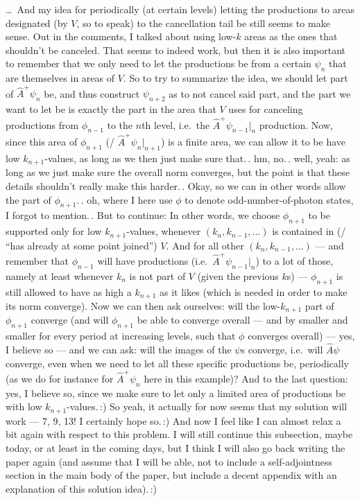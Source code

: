\documentclass{report}
\begin{document}
\ldots\ And my idea for periodically (at certain levels) letting the productions to areas designated (by $V$, so to speak) to the cancellation tail be still seems to make sense. Out in the comments, I talked about using low-$k$ areas as the ones that shouldn't be canceled. That seems to indeed work, but then it is also important to remember that we only need to let the productions be from a certain $\psi_n$ that are themselves in areas of $V$. So to try to summarize the idea, we should let part of $\hat A^+ \psi_n$ be, and thus construct $\psi_{n+2}$ as to not cancel said part, and the part we want to let be is exactly the part in the area that $V$ uses for canceling productions from $\phi_{n-1}$ to the $n$th level, i.e.\ the $\hat A^+ \psi_{n-1} |_n$ production. Now, since this area of $\phi_{n+1}$ (/ $\hat A^+ \psi_{n}|_{n+1}$) is a finite area, we can allow it to be have low $k_{n+1}$-values, as long as we then just make sure that.\,. hm, no.\,. well, yeah: as long as we just make sure the overall norm converges, but the point is that these details shouldn't really make this harder.\,. Okay, so we can in other words allow the part of $\phi_{n+1}$.\,. oh, where I here use $\phi$ to denote odd-number-of-photon states, I forgot to mention.\,. But to continue: In other words, we choose $\phi_{n+1}$ to be supported only for low $k_{n+1}$-values, whenever $(k_{n}, k_{n-1}, \ldots)$ is contained in (/ ``has already at some point joined'') $V$. And for all other $(k_{n}, k_{n-1}, \ldots)$ --- and remember that $\phi_{n-1}$ will have productions (i.e.\ $\hat A^+ \psi_{n-1}|_n$) to a lot of those, namely at least whenever $k_n$ is not part of $V$ (given the previous $k$s) --- $\phi_{n+1}$ is still allowed to have as high a $k_{n+1}$ as it likes (which is needed in order to make its norm converge). Now we can then ask ourselves: will the low-$k_{n+1}$ part of $\phi_{n+1}$ converge (and will $\phi_{n+1}$ be able to converge overall --- and by smaller and smaller for every period at increasing levels, such that $\phi$ converges overall) --- yes, I believe so --- and we can ask: will the images of the $\psi$s converge, i.e.\ will $\hat A \psi$ converge, even when we need to let all these specific productions be, periodically (as we do for instance for $\hat A^+ \psi_n$ here in this example)? And to the last question: yes, I believe so, since we make sure to let only a limited area of productions be with low $k_{n+1}$-values.\,:) So yeah, it actually for now seems that my solution will work --- 7, 9, 13! I certainly hope so.\,:) And now I feel like I can almost relax a bit again with respect to this problem. I will still continue this subsection, maybe today, or at least in the coming days, but I think I will also go back writing the paper again (and assume that I will be able, not to include a self-adjointness section in the main body of the paper, but include a decent appendix with an explanation of this solution idea).\,:) %
\end{document}
